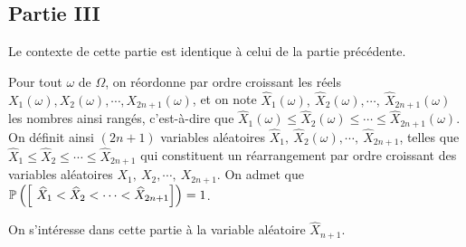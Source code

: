 \documentclass[11pt]{article}%
\begin{document}
\subsection*{Partie III}

Le contexte de cette partie est identique à celui de la partie
précédente.

Pour tout $\omega $ de $\Omega $, on réordonne par ordre croissant les
réels $X_{1}\left( \omega \right),X_{2}\left( \omega
\right),\cdots,X_{2n + 1}\left( \omega \right) $, et on note
$\widehat{X}_{1}\left( \omega
\right),\ \widehat{X}_{2}\left( \omega \right),\cdots,\ \widehat{X}_{2n
+ 1}\left( \omega \right) $ les nombres ainsi rangés, c'est-à-dire que
$\widehat{X}_{1}\left( \omega \right) \leq \widehat{X}_{2}\left(
\omega \right) \leq \cdots \leq \widehat{X}_{2n + 1}\left( \omega
\right) $.
On définit ainsi $\left( 2n + 1\right) $ variables aléatoires
$\widehat{X}_{1},\ \widehat{X}_{2}\left( \omega \right),\cdots,\
\widehat{X}_{2n + 1}$, telles que $\widehat{X}_{1}\leq
\widehat{X}_{2}\leq \cdots \leq 
\widehat{X}_{2n + 1}$ qui constituent un réarrangement par ordre
croissant
des variables aléatoires $X_{1},\ X_{2},\cdots,\ X_{2n + 1}$. On admet
que $\Prob\left(\Ev{ \ \widehat{X}_{1}<\widehat{X}_{2}<\cdots
<\widehat{X}_{2n + 1}}\right) = 1$.

On s'intéresse dans cette partie à la variable aléatoire
$\widehat{X}_{n + 1}.$
\end{document}
